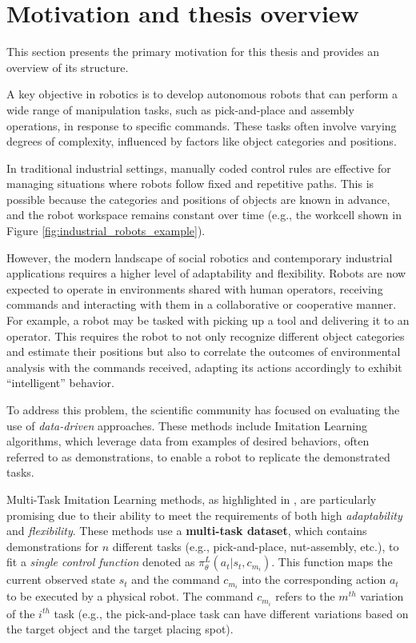 \section{Motivation and thesis overview}
\label{sec:motivation}
This section presents the primary motivation for this thesis and provides an overview of its structure.

A key objective in robotics is to develop autonomous robots that can perform a wide range of manipulation tasks, such as pick-and-place and assembly operations, in response to specific commands. These tasks often involve varying degrees of complexity, influenced by factors like object categories and positions.

In traditional industrial settings, manually coded control rules are effective for managing situations where robots follow fixed and repetitive paths. This is possible because the categories and positions of objects are known in advance, and the robot workspace remains constant over time (e.g., the workcell shown in Figure \ref{fig:industrial_robots_example}).

However, the modern landscape of social robotics and contemporary industrial applications requires a higher level of adaptability and flexibility. Robots are now expected to operate in environments shared with human operators, receiving commands and interacting with them in a collaborative or cooperative manner. For example, a robot may be tasked with picking up a tool and delivering it to an operator. This requires the robot to not only recognize different object categories and estimate their positions but also to correlate the outcomes of environmental analysis with the commands received, adapting its actions accordingly to exhibit ``intelligent'' behavior.



To address this problem, the scientific community has focused on evaluating the use of \textit{data-driven} approaches. These methods include Imitation Learning algorithms, which leverage data from examples of desired behaviors, often referred to as demonstrations, to enable a robot to replicate the demonstrated tasks.

Multi-Task Imitation Learning methods, as highlighted in \cite{jang2022bc_z, dasari2021transformers_one_shot, mandi2022towards_more_generalizable_one_shot, brohan2022rt}, are particularly promising due to their ability to meet the requirements of both high \textit{adaptability} and \textit{flexibility}. These methods use a \textbf{multi-task dataset}, which contains demonstrations for $n$ different tasks (e.g., pick-and-place, nut-assembly, etc.), to fit a \textit{single control function} denoted as $\pi^{L}_{\theta}(a_{t}|s_{t}, c_{m_{i}})$. This function maps the current observed state $s_{t}$ and the command $c_{m_{i}}$ into the corresponding action $a_{t}$ to be executed by a physical robot. The command $c_{m_{i}}$ refers to the $m^{th}$ variation of the $i^{th}$ task (e.g., the pick-and-place task can have different variations based on the target object and the target placing spot).

